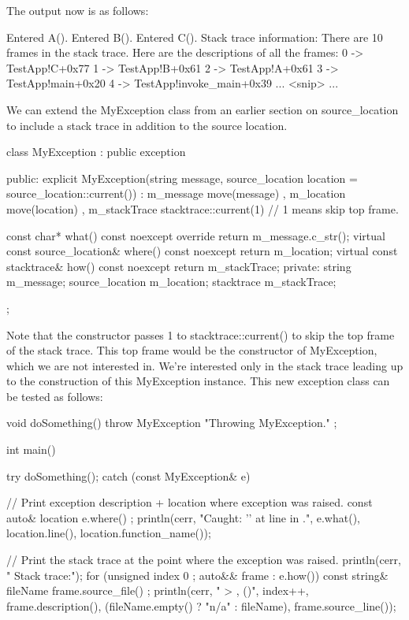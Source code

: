 The output now is as follows:

\begin{shell}
Entered A().
Entered B().
Entered C().
  Stack trace information:
    There are 10 frames in the stack trace.
    Here are the descriptions of all the frames:
      0 -> TestApp!C+0x77
      1 -> TestApp!B+0x61
      2 -> TestApp!A+0x61
      3 -> TestApp!main+0x20
      4 -> TestApp!invoke_main+0x39
      ... <snip> ...
\end{shell}


We can extend the MyException class from an earlier section on source\_location to include a stack trace in addition to the source location.

\begin{cpp}
class MyException : public exception
{
    public:
        explicit MyException(string message,
        source_location location = source_location::current())
            : m_message { move(message) }
            , m_location { move(location) }
            , m_stackTrace { stacktrace::current(1) } // 1 means skip top frame.
        { }

        const char* what() const noexcept override { return m_message.c_str(); }
        virtual const source_location& where() const noexcept{ return m_location; }
        virtual const stacktrace& how() const noexcept { return m_stackTrace; }
    private:
        string m_message;
        source_location m_location;
        stacktrace m_stackTrace;
};
\end{cpp}

Note that the constructor passes 1 to stacktrace::current() to skip the top frame of the stack trace. This top frame would be the constructor of MyException, which we are not interested in. We’re interested only in the stack trace leading up to the construction of this MyException instance. This new exception class can be tested as follows:

\begin{cpp}
void doSomething()
{
    throw MyException { "Throwing MyException." };
}

int main()
{
    try {
        doSomething();
    } catch (const MyException& e) {
        // Print exception description + location where exception was raised.
        const auto& location { e.where() };
        println(cerr, "Caught: '{}' at line {} in {}.",
            e.what(), location.line(), location.function_name());

        // Print the stack trace at the point where the exception was raised.
        println(cerr, " Stack trace:");
        for (unsigned index { 0 }; auto&& frame : e.how()) {
            const string& fileName { frame.source_file() };
            println(cerr, " {}> {}, {}({})", index++, frame.description(),
                (fileName.empty() ? "n/a" : fileName), frame.source_line());
        }
    }
}
\end{cpp}

